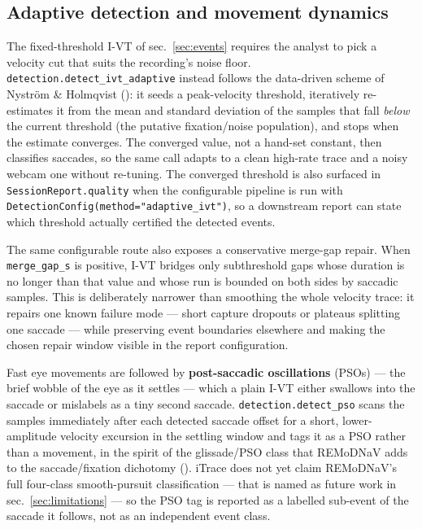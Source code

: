 \documentclass[
]{article}
\begin{document}
\subsection{Adaptive detection and movement
dynamics}\label{adaptive-detection-and-movement-dynamics}

The fixed-threshold I-VT of sec.~\ref{sec:events} requires the analyst
to pick a velocity cut that suits the recording's noise floor.
\texttt{detection.detect\_ivt\_adaptive} instead follows the data-driven
scheme of Nyström \& Holmqvist
(): it
seeds a peak-velocity threshold, iteratively re-estimates it from the
mean and standard deviation of the samples that fall \emph{below} the
current threshold (the putative fixation/noise population), and stops
when the estimate converges. The converged value, not a hand-set
constant, then classifies saccades, so the same call adapts to a clean
high-rate trace and a noisy webcam one without re-tuning. The converged
threshold is also surfaced in \texttt{SessionReport.quality} when the
configurable pipeline is run with
\texttt{DetectionConfig(method="adaptive\_ivt")}, so a downstream report
can state which threshold actually certified the detected events.

The same configurable route also exposes a conservative merge-gap
repair. When \texttt{merge\_gap\_s} is positive, I-VT bridges only
subthreshold gaps whose duration is no longer than that value and whose
run is bounded on both sides by saccadic samples. This is deliberately
narrower than smoothing the whole velocity trace: it repairs one known
failure mode --- short capture dropouts or plateaus splitting one
saccade --- while preserving event boundaries elsewhere and making the
chosen repair window visible in the report configuration.

Fast eye movements are followed by \textbf{post-saccadic oscillations}
(PSOs) --- the brief wobble of the eye as it settles --- which a plain
I-VT either swallows into the saccade or mislabels as a tiny second
saccade. \texttt{detection.detect\_pso} scans the samples immediately
after each detected saccade offset for a short, lower-amplitude velocity
excursion in the settling window and tags it as a PSO rather than a
movement, in the spirit of the glissade/PSO class that REMoDNaV adds to
the saccade/fixation dichotomy (). iTrace does not yet claim REMoDNaV's full four-class
smooth-pursuit classification --- that is named as future work in
sec.~\ref{sec:limitations} --- so the PSO tag is reported as a labelled
sub-event of the saccade it follows, not as an independent event class.
\end{document}
